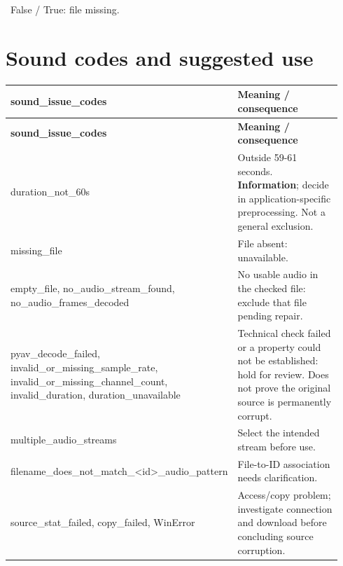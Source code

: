 \documentclass[a4paper,9pt]{extarticle}
\begin{document}
\noindent\textbullet\ False / True: file missing.\par

\section*{Sound codes and suggested use}

\begingroup\small\begin{longtable}{>{\raggedright\arraybackslash}p{0.39\linewidth}>{\raggedright\arraybackslash}p{0.55\linewidth}}

\rowcolor{navy} \color{white}\bfseries sound\_issue\_codes & \color{white}\bfseries Meaning / consequence \\

\endfirsthead

\rowcolor{navy} \color{white}\bfseries sound\_issue\_codes & \color{white}\bfseries Meaning / consequence \\

\endhead

\rowcolor{pale} duration\_not\_60s & Outside 59-61 seconds. \textbf{Information}; decide in application-specific preprocessing. Not a general exclusion. \\

missing\_file & File absent: unavailable. \\

\rowcolor{pale} empty\_file, no\_audio\_stream\_found, no\_audio\_frames\_decoded & No usable audio in the checked file: exclude that file pending repair. \\

pyav\_decode\_failed, invalid\_or\_missing\_sample\_rate, invalid\_or\_missing\_channel\_count, invalid\_duration, duration\_unavailable & Technical check failed or a property could not be established: hold for review. Does not prove the original source is permanently corrupt. \\

\rowcolor{pale} multiple\_audio\_streams & Select the intended stream before use. \\

filename\_does\_not\_match\_\textless{}id\textgreater{}\_audio\_pattern & File-to-ID association needs clarification. \\

\rowcolor{pale} source\_stat\_failed, copy\_failed, WinError & Access/copy problem; investigate connection and download before concluding source corruption. \\

\end{longtable}\endgroup
\end{document}
